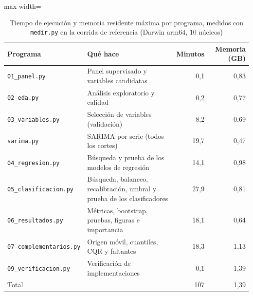 \begin{table}[htbp]\centering\footnotesize
\caption{Tiempo de ejecución y memoria residente máxima por programa, medidos con \texttt{medir.py} en la corrida de referencia (Darwin arm64, 10 núcleos)}\label{tab:tiempos}
\begin{adjustbox}{max width=\textwidth}\begin{tabular}{lp{6.4cm}rr}\toprule
Programa & Qué hace & Minutos & Memoria (GB)\\ \midrule
\texttt{01\_panel.py} & Panel supervisado y variables candidatas & 0{,}1 & 0{,}83 \\
\texttt{02\_eda.py} & Análisis exploratorio y calidad & 0{,}2 & 0{,}77 \\
\texttt{03\_variables.py} & Selección de variables (validación) & 8{,}2 & 0{,}69 \\
\texttt{sarima.py} & SARIMA por serie (todos los cortes) & 19{,}7 & 0{,}47 \\
\texttt{04\_regresion.py} & Búsqueda y prueba de los modelos de regresión & 14{,}1 & 0{,}98 \\
\texttt{05\_clasificacion.py} & Búsqueda, balanceo, recalibración, umbral y prueba de los clasificadores & 27{,}9 & 0{,}81 \\
\texttt{06\_resultados.py} & Métricas, bootstrap, pruebas, figuras e importancia & 18{,}1 & 0{,}64 \\
\texttt{07\_complementarios.py} & Origen móvil, cuantiles, CQR y faltantes & 18{,}3 & 1{,}13 \\
\texttt{09\_verificacion.py} & Verificación de implementaciones & 0{,}1 & 1{,}39 \\
\midrule Total & & 107 & 1{,}39 \\
\bottomrule\end{tabular}\end{adjustbox}\end{table}
